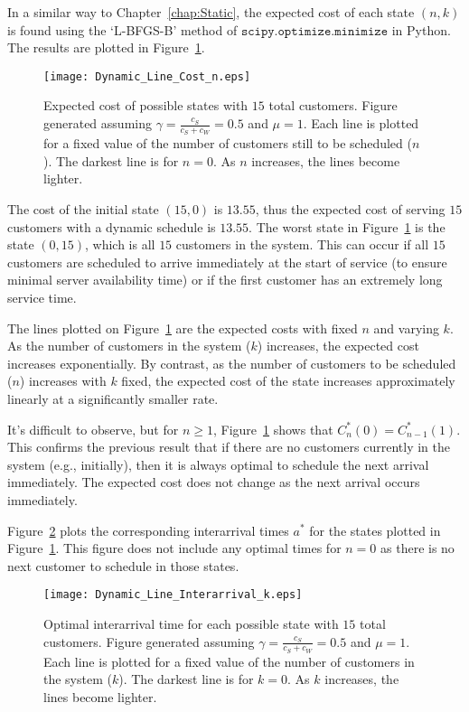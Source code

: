 In a similar way to Chapter~\ref{chap:Static}, the expected cost of each state $(n, k)$ is found using the `L-BFGS-B' method of $\texttt{scipy.optimize.minimize}$ in Python. The results are plotted in Figure~\ref{fig:Dynamic_Cost_15}.
\begin{figure}[htb]
	\centering
	\texttt{[image: Dynamic\_Line\_Cost\_n.eps]}
	\caption{Expected cost of possible states with $15$ total customers. Figure generated assuming $\gamma = \frac{c_{S}}{c_{S} + c_{W}} = 0.5$ and $\mu = 1$. Each line is plotted for a fixed value of the number of customers still to be scheduled ($n$). The darkest line is for $n = 0$. As $n$ increases, the lines become lighter.}
	\label{fig:Dynamic_Cost_15}
\end{figure}

The cost of the initial state $(15, 0)$ is $13.55$, thus the expected cost of serving $15$ customers with a dynamic schedule is $13.55$. The worst state in Figure~\ref{fig:Dynamic_Cost_15} is the state $(0, 15)$, which is all $15$ customers in the system. This can occur if all $15$ customers are scheduled to arrive immediately at the start of service (to ensure minimal server availability time) or if the first customer has an extremely long service time.

The lines plotted on Figure~\ref{fig:Dynamic_Cost_15} are the expected costs with fixed $n$ and varying $k$. As the number of customers in the system ($k$) increases, the expected cost increases exponentially. By contrast, as the number of customers to be scheduled ($n$) increases with $k$ fixed, the expected cost of the state increases approximately linearly at a significantly smaller rate.

It's difficult to observe, but for $n \geq 1$, Figure~\ref{fig:Dynamic_Cost_15} shows that $C_{n}^{*} (0) = C_{n - 1}^{*} (1)$. This confirms the previous result that if there are no customers currently in the system (e.g., initially), then it is always optimal to schedule the next arrival immediately. The expected cost does not change as the next arrival occurs immediately.

Figure~\ref{fig:Dynamic_Time_15} plots the corresponding interarrival times $a^{*}$ for the states plotted in Figure~\ref{fig:Dynamic_Cost_15}. This figure does not include any optimal times for $n = 0$ as there is no next customer to schedule in those states.
\begin{figure}[htb]
	\centering
	\texttt{[image: Dynamic\_Line\_Interarrival\_k.eps]}
	\caption{Optimal interarrival time for each possible state with $15$ total customers. Figure generated assuming $\gamma = \frac{c_{S}}{c_{S} + c_{W}} = 0.5$ and $\mu = 1$. Each line is plotted for a fixed value of the number of customers in the system ($k$). The darkest line is for $k = 0$. As $k$ increases, the lines become lighter.}
	\label{fig:Dynamic_Time_15}
\end{figure}

